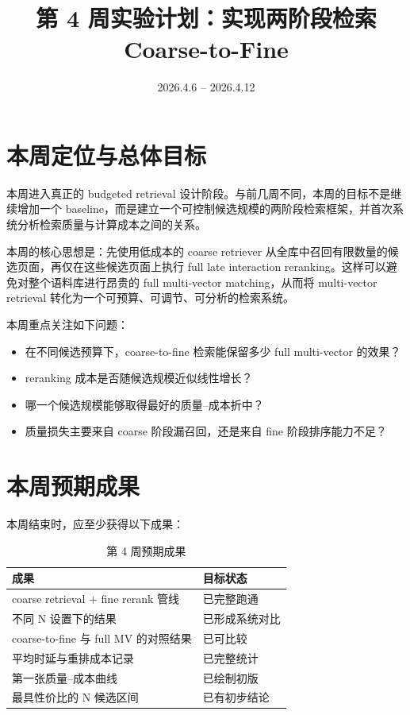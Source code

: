 \documentclass[UTF8,a4paper,12pt]{ctexart}
\title{\textbf{第 4 周实验计划：实现两阶段检索 Coarse-to-Fine}}
\author{}
\date{2026.4.6 -- 2026.4.12}
\begin{document}
	
	\maketitle
	
	\section{本周定位与总体目标}
	
	本周进入真正的 budgeted retrieval 设计阶段。与前几周不同，本周的目标不是继续增加一个 baseline，而是建立一个可控制候选规模的两阶段检索框架，并首次系统分析检索质量与计算成本之间的关系。
	
	本周的核心思想是：先使用低成本的 coarse retriever 从全库中召回有限数量的候选页面，再仅在这些候选页面上执行 full late interaction reranking。这样可以避免对整个语料库进行昂贵的 full multi-vector matching，从而将 multi-vector retrieval 转化为一个可预算、可调节、可分析的检索系统。
	
	本周重点关注如下问题：
	
	\begin{itemize}[leftmargin=2em]
		\item 在不同候选预算下，coarse-to-fine 检索能保留多少 full multi-vector 的效果？
		\item reranking 成本是否随候选规模近似线性增长？
		\item 哪一个候选规模能够取得最好的质量--成本折中？
		\item 质量损失主要来自 coarse 阶段漏召回，还是来自 fine 阶段排序能力不足？
	\end{itemize}
	
	\section{本周预期成果}
	
	本周结束时，应至少获得以下成果：
	
	\begin{table}[H]
		\centering
		\caption{第 4 周预期成果}
		\begin{tabular}{p{7cm}p{6cm}}
			\toprule
			\textbf{成果} & \textbf{目标状态} \\
			\midrule
			coarse retrieval + fine rerank 管线 & 已完整跑通 \\
			不同 N 设置下的结果 & 已形成系统对比 \\
			coarse-to-fine 与 full MV 的对照结果 & 已可比较 \\
			平均时延与重排成本记录 & 已完整统计 \\
			第一张质量--成本曲线 & 已绘制初版 \\
			最具性价比的 N 候选区间 & 已有初步结论 \\
			\bottomrule
		\end{tabular}
	\end{table}
	
\end{document}
